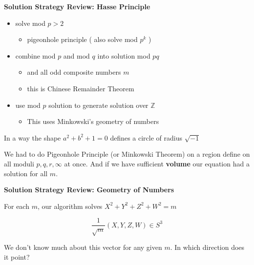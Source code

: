 \documentclass[12pt]{article}
\begin{document}
\newpage

\textbf{Solution Strategy Review: Hasse Principle}

\begin{itemize}
\item solve mod $p  > 2$
\begin{itemize}
	\item pigeonhole principle ( also solve mod $p^k$ )
\end{itemize}
\item combine mod $p$ and mod $q$ into solution mod $pq$ 
\begin{itemize}
	\item and all odd composite numbers $m$
	\item this is Chinese Remainder Theorem
\end{itemize}
\item use mod $p$ solution to generate solution over $\mathbb{Z}$
\begin{itemize}
	\item This uses Minkowski's geometry of numbers
\end{itemize}
\end{itemize}

\noindent In a way the shape $a^2 + b^2 + 1 = 0$ defines a circle of radius $\sqrt{-1}$ \newline

\noindent We had to do Pigeonhole Principle (or Minkowski Theorem) on a region define on all moduli $p, q, r, \infty$ at once.  And if we have sufficient \textbf{volume} our equation had a solution for all $m$. \newline

\newpage

\textbf{Solution Strategy Review: Geometry of Numbers} \newline

\noindent For each $m$, our algorithm solves  $X^2 + Y^2 + Z^2 + W^2 = m$

$$ \frac{1}{\sqrt{m}} (X,Y,Z,W) \in S^3 $$

We don't know much about this vector for any given $m$.  In which direction does it point?

\newpage
\end{document}
